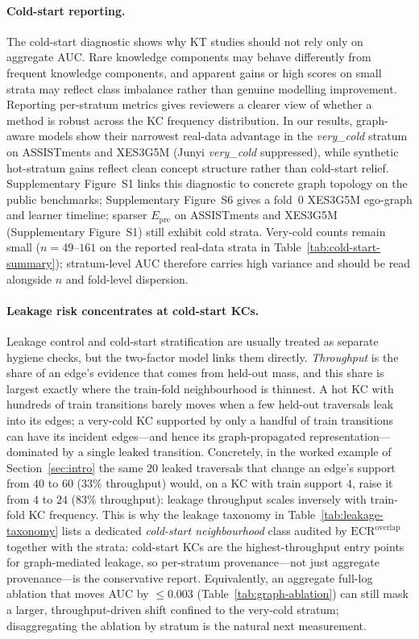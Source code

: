 \documentclass[pdflatex,sn-mathphys-num]{sn-jnl}
\newcommand{\Epre}{\ensuremath{E_{\text{pre}}}}
\newcommand{\KCs}{knowledge components}
\begin{document}
\paragraph{Cold-start reporting.}
The cold-start diagnostic shows why KT studies should not rely only on
aggregate AUC. Rare \KCs{} may behave differently from frequent
\KCs{}, and apparent gains or high scores on small strata may reflect
class imbalance rather than genuine modelling improvement. Reporting
per-stratum metrics gives reviewers a clearer view of whether a method
is robust across the KC frequency distribution. In our results,
graph-aware models show their narrowest real-data advantage in the
\emph{very\_cold} stratum on ASSISTments and XES3G5M (Junyi \emph{very\_cold}
suppressed), while synthetic hot-stratum gains reflect clean
concept structure rather than cold-start relief.
Supplementary Figure~S1 links this diagnostic to concrete graph topology on
the public benchmarks; Supplementary Figure~S6 gives a fold~0 XES3G5M ego-graph
and learner timeline; sparser $\Epre$ on ASSISTments and XES3G5M
(Supplementary Figure~S1) still exhibit cold strata. Very-cold counts remain small ($n{=}49$--$161$ on the reported
real-data strata in Table~\ref{tab:cold-start-summary}); stratum-level AUC
therefore carries high variance and should be read alongside $n$ and
fold-level dispersion.

\paragraph{Leakage risk concentrates at cold-start KCs.}
Leakage control and cold-start stratification are usually treated as separate
hygiene checks, but the two-factor model links them directly. \emph{Throughput}
is the share of an edge's evidence that comes from held-out mass, and this share
is largest exactly where the train-fold neighbourhood is thinnest. A hot KC with
hundreds of train transitions barely moves when a few held-out traversals leak
into its edges; a very-cold KC supported by only a handful of train transitions
can have its incident edges---and hence its graph-propagated representation---
dominated by a single leaked transition. Concretely, in the worked example of
Section~\ref{sec:intro} the same $20$ leaked traversals that change an edge's
support from $40$ to $60$ ($33\%$ throughput) would, on a KC with train support
$4$, raise it from $4$ to $24$ ($83\%$ throughput): leakage throughput scales
inversely with train-fold KC frequency. This is why the leakage taxonomy in
Table~\ref{tab:leakage-taxonomy} lists a dedicated \emph{cold-start
neighbourhood} class audited by $\mathrm{ECR}^{\mathrm{overlap}}$ together with
the strata: cold-start KCs are the highest-throughput entry points for
graph-mediated leakage, so per-stratum provenance---not just aggregate
provenance---is the conservative report. Equivalently, an aggregate full-log
ablation that moves AUC by ${\leq}0.003$ (Table~\ref{tab:graph-ablation}) can
still mask a larger, throughput-driven shift confined to the very-cold stratum;
disaggregating the ablation by stratum is the natural next measurement.
\end{document}
